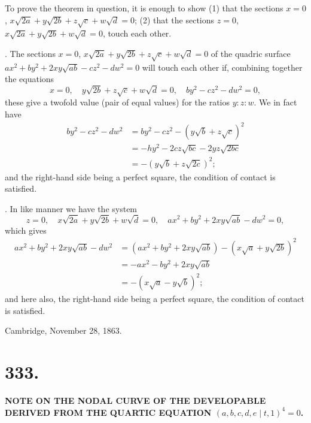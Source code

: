 \documentclass[11pt,a4paper]{article}
\begin{document}
To prove the theorem in question, it is enough to show (1) that the sections $x=0$, $x\sqrt{2a}+y\sqrt{2b}+z\sqrt{c}+w\sqrt{d}=0$; (2) that the sections $z=0$, $x\sqrt{2a}+y\sqrt{2b}+w\sqrt{d}=0$, touch each other.

\medskip
{}. The sections $x=0$, $x\sqrt{2a}+y\sqrt{2b}+z\sqrt{c}+w\sqrt{d}=0$ of the quadric surface $ax^2+by^2+2xy\sqrt{ab}-cz^2-dw^2=0$ will touch each other if, combining together the equations
\[
x=0, \quad y\sqrt{2b} + z\sqrt{c} + w\sqrt{d} = 0, \quad by^2 - cz^2 - dw^2 = 0,
\]
these give a twofold value (pair of equal values) for the ratios $y:z:w$. We in fact have
\begin{align*}
by^2 - cz^2 - dw^2 &= by^2 - cz^2 - (y\sqrt{b} + z\sqrt{c})^2 \\
&= -hy^2 - 2cz\sqrt{bc} - 2yz\sqrt{2bc} \\
&= -(y\sqrt{b} + z\sqrt{2c})^2;
\end{align*}
and the right-hand side being a perfect square, the condition of contact is satisfied.

\medskip
{}. In like manner we have the system
\[
z=0, \quad x\sqrt{2a} + y\sqrt{2b} + w\sqrt{d} = 0, \quad ax^2 + by^2 + 2xy\sqrt{ab} - dw^2 = 0,
\]
which gives
\begin{align*}
ax^2 + by^2 + 2xy\sqrt{ab} - dw^2 &= (ax^2+by^2+2xy\sqrt{ab}) - (x\sqrt{a}+y\sqrt{2b})^2 \\
&= -ax^2 - by^2 + 2xy\sqrt{ab} \\
&= -(x\sqrt{a} - y\sqrt{b})^2;
\end{align*}
and here also, the right-hand side being a perfect square, the condition of contact is satisfied.

\begin{flushright}
Cambridge, November 28, 1863.
\end{flushright}


\newpage
\section*{333.}

\begin{center}
\textbf{NOTE ON THE NODAL CURVE OF THE DEVELOPABLE DERIVED FROM THE QUARTIC EQUATION $(a,b,c,d,e\mid t,1)^4 = 0$.}
\end{center}
\end{document}
